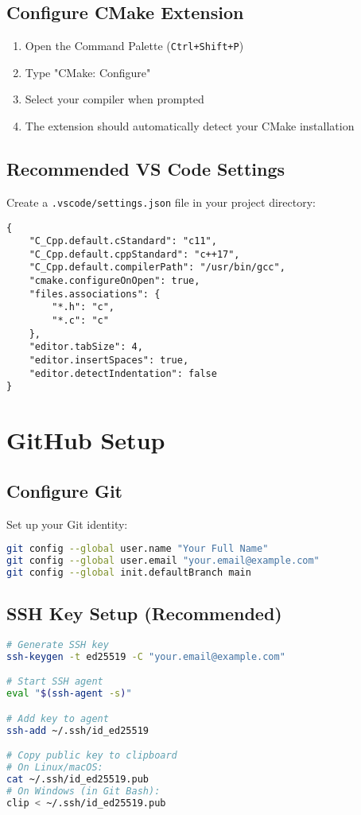 \documentclass[11pt,a4paper]{article}
\begin{document}
\subsection{Configure CMake Extension}
\begin{enumerate}
    \item Open the Command Palette (\texttt{Ctrl+Shift+P})
    \item Type "CMake: Configure"
    \item Select your compiler when prompted
    \item The extension should automatically detect your CMake installation
\end{enumerate}

\subsection{Recommended VS Code Settings}
Create a \texttt{.vscode/settings.json} file in your project directory:

\begin{lstlisting}
{
    "C_Cpp.default.cStandard": "c11",
    "C_Cpp.default.cppStandard": "c++17",
    "C_Cpp.default.compilerPath": "/usr/bin/gcc",
    "cmake.configureOnOpen": true,
    "files.associations": {
        "*.h": "c",
        "*.c": "c"
    },
    "editor.tabSize": 4,
    "editor.insertSpaces": true,
    "editor.detectIndentation": false
}
\end{lstlisting}

\section{GitHub Setup}

\subsection{Configure Git}
Set up your Git identity:

\begin{lstlisting}[language=bash]
git config --global user.name "Your Full Name"
git config --global user.email "your.email@example.com"
git config --global init.defaultBranch main
\end{lstlisting}

\subsection{SSH Key Setup (Recommended)}
\begin{lstlisting}[language=bash]
# Generate SSH key
ssh-keygen -t ed25519 -C "your.email@example.com"

# Start SSH agent
eval "$(ssh-agent -s)"

# Add key to agent
ssh-add ~/.ssh/id_ed25519

# Copy public key to clipboard
# On Linux/macOS:
cat ~/.ssh/id_ed25519.pub
# On Windows (in Git Bash):
clip < ~/.ssh/id_ed25519.pub
\end{lstlisting}
\end{document}

